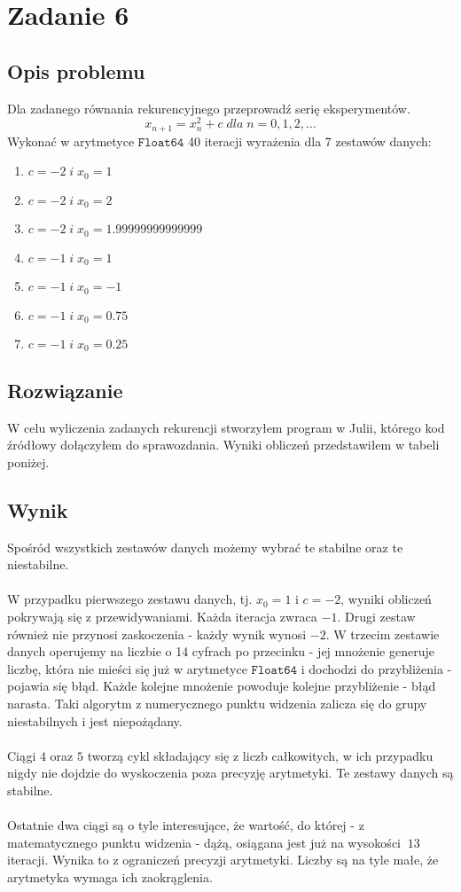 \section{Zadanie 6}
\subsection{Opis problemu}
Dla zadanego równania rekurencyjnego przeprowadź serię eksperymentów.
$$ x_{n+1} = x_{n}^2 + c\; dla\; n = 0, 1, 2,\ldots$$
Wykonać w arytmetyce $ \mathtt{Float64} $ 40 iteracji wyrażenia dla 7 zestawów danych:
\begin{enumerate}
  \item $ c = -2 \;i\; x_0 = 1 $
  \item $ c = -2 \;i\; x_0 = 2 $
  \item $ c = -2 \;i\; x_0 = 1.99999999999999 $
  \item $ c = -1 \;i\; x_0 = 1 $
  \item $ c = -1 \;i\; x_0 = -1 $
  \item $ c = -1 \;i\; x_0 = 0.75 $
  \item $ c = -1 \;i\; x_0 = 0.25 $
\end{enumerate}
\subsection{Rozwiązanie}
W celu wyliczenia zadanych rekurencji stworzyłem program w Julii, którego kod źródłowy dołączyłem do sprawozdania. Wyniki obliczeń przedstawiłem w tabeli poniżej.
\subsection{Wynik}
Spośród wszystkich zestawów danych możemy wybrać te stabilne oraz te niestabilne. \\\\
W przypadku pierwszego zestawu danych, tj. $ x_0 = 1 $ i $ c = -2 $, wyniki obliczeń pokrywają się z przewidywaniami. Każda iteracja zwraca $ -1 $. Drugi zestaw również nie przynosi zaskoczenia - każdy wynik wynosi $ -2 $. W trzecim zestawie danych operujemy na liczbie o 14 cyfrach po przecinku - jej mnożenie generuje liczbę, która nie mieści się już w arytmetyce $ \mathtt{Float64} $ i dochodzi do przybliżenia - pojawia się błąd. Każde kolejne mnożenie powoduje kolejne przybliżenie - błąd narasta. Taki algorytm z numerycznego punktu widzenia zalicza się do grupy niestabilnych i jest niepożądany. \\\\
Ciągi $ 4 $ oraz $ 5 $ tworzą cykl składający się z liczb całkowitych, w ich przypadku nigdy nie dojdzie do wyskoczenia poza precyzję arytmetyki. Te zestawy danych są stabilne.\\\\
Ostatnie dwa ciągi są o tyle interesujące, że wartość, do której - z matematycznego punktu widzenia - dążą, osiągana jest już na wysokości $ ~13 $ iteracji. Wynika to z ograniczeń precyzji arytmetyki. Liczby są na tyle małe, że arytmetyka wymaga ich zaokrąglenia. \\\\
\begin{center}
    
\end{center}